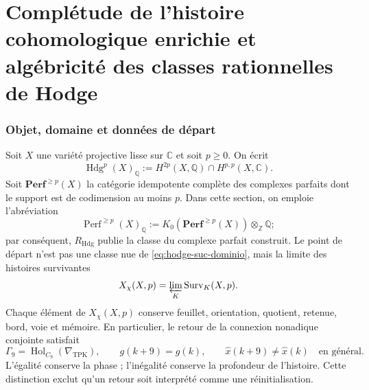 %

\ifdefined\HMTSucesoraStructureTrace
\fi

\chapter{Complétude de l'histoire cohomologique enrichie et algébricité des classes rationnelles de Hodge}

\subsection*{Objet, domaine et données de départ}

Soit \(X\) une variété projective lisse sur \(\mathbb C\) et soit
\(p\geq0\). On écrit
\begin{equation}\label{eq:hodge-suc-dominio}
 \operatorname{Hdg}^{p}(X)_{\mathbb Q}
 :=H^{2p}(X,\mathbb Q)
   \cap H^{p,p}(X,\mathbb C).
\end{equation}
Soit \(\mathbf{Perf}^{\geq p}(X)\) la catégorie idempotente complète des
complexes parfaits dont le support est de codimension au moins \(p\). Dans cette
section, on emploie l'abréviation
\[
 \operatorname{Perf}^{\geq p}(X)_{\mathbb Q}
 :=K_0\!\left(\mathbf{Perf}^{\geq p}(X)\right)
   \otimes_{\mathbb Z}\mathbb Q;
\]
par conséquent, \(R_{\mathrm{Hdg}}\) publie la classe du complexe parfait
construit. Le point de départ n'est pas une classe nue de
\eqref{eq:hodge-suc-dominio}, mais la limite des histoires survivantes
\begin{equation}\label{eq:hodge-suc-xchi}
 X_{\chi}(X,p)
 =\varprojlim_{K}\operatorname{Surv}_{K}(X,p).
\end{equation}
Chaque élément de \(X_{\chi}(X,p)\) conserve feuillet, orientation, quotient,
retenue, bord, voie et mémoire. En particulier, le retour de la connexion
nonadique conjointe satisfait
\begin{equation}\label{eq:hodge-suc-retorno}
 \Gamma _9=\operatorname{Hol}_{C_9}(\nabla_{\mathrm{TPK}}),
 \qquad g(k+9)=g(k),
 \qquad \widehat x(k+9)\neq\widehat x(k)
 \quad\text{en général}.
\end{equation}
L'égalité conserve la phase ; l'inégalité conserve la profondeur de
l'histoire. Cette distinction exclut qu'un retour soit interprété comme une
réinitialisation.

